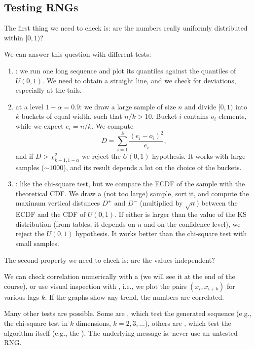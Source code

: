 \subsection{Testing RNGs}

The first thing we need to check is: are the numbers really uniformly distributed within $[0,1)$?

We can answer this question with different tests:
\begin{enumerate}
\item {}: we run one long sequence and plot its quantiles against the quantiles of $U(0,1)$. We need to obtain a straight line, and we check for deviations, especially at the tails.
\item {} at a level $1-\alpha = 0.9$: we draw a large sample of size $n$ and divide $[0,1)$ into $k$ buckets of equal width, such that $n/k > 10$. Bucket $i$ contains $o_i$ elements, while we expect $e_i = n/k$. We compute
\[
D = \sum_{i=1}^{k} \frac{(e_i - o_i)^2}{e_i},
\]
and if $D > \chi^2_{k-1,1-\alpha}$ we reject the $U(0,1)$ hypothesis. It works with large samples ($\sim 1000$), and its result depends a lot on the choice of the buckets.
\item {}: like the chi-square test, but we compare the ECDF of the sample with the theoretical CDF. We draw a (not too large) sample, sort it, and compute the maximum vertical distances $D^+$ and $D^-$ (multiplied by $\sqrt{n}$) between the ECDF and the CDF of $U(0,1)$. If either is larger than the value of the KS distribution (from tables, it depends on $n$ and on the confidence level), we reject the $U(0,1)$ hypothesis. It works better than the chi-square test with small samples.
\end{enumerate}

The second property we need to check is: are the values independent?

We can check correlation numerically with a  (we will see it at the end of the course), or use visual inspection with , i.e., we plot the pairs $(x_i, x_{i+k})$ for various lags $k$. If the graphs show any trend, the numbers are correlated.

Many other tests are possible. Some are , which test the generated sequence (e.g., the chi-square test in $k$ dimensions, $k = 2, 3, \dots$), others are , which test the algorithm itself (e.g., the ). The underlying message is: never use an untested RNG.

